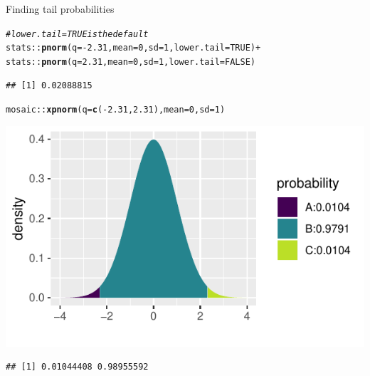 \documentclass{beamer}\usepackage[]{graphicx}\usepackage[]{color}
\newcommand{\hlnum}[1]{\textcolor[rgb]{0.686,0.059,0.569}{#1}}%
\newcommand{\hlcom}[1]{\textcolor[rgb]{0.678,0.584,0.686}{\textit{#1}}}%
\newcommand{\hlopt}[1]{\textcolor[rgb]{0,0,0}{#1}}%
\newcommand{\hlstd}[1]{\textcolor[rgb]{0.345,0.345,0.345}{#1}}%
\newcommand{\hlkwc}[1]{\textcolor[rgb]{0.333,0.667,0.333}{#1}}%
\newcommand{\hlkwd}[1]{\textcolor[rgb]{0.737,0.353,0.396}{\textbf{#1}}}%
\newenvironment{knitrout}{}{} %
\begin{document}
\begin{frame}[fragile]{Finding tail probabilities}



\begin{knitrout}\scriptsize
{}\color{fgcolor}
\begin{alltt}
\hlcom{# lower.tail = TRUE is the default}
\hlstd{stats}\hlopt{::}\hlkwd{pnorm}\hlstd{(}\hlkwc{q} \hlstd{=} \hlopt{-}\hlnum{2.31}\hlstd{,} \hlkwc{mean} \hlstd{=} \hlnum{0}\hlstd{,} \hlkwc{sd} \hlstd{=} \hlnum{1}\hlstd{,} \hlkwc{lower.tail} \hlstd{=} \hlnum{TRUE}\hlstd{)} \hlopt{+}
\hlstd{stats}\hlopt{::}\hlkwd{pnorm}\hlstd{(}\hlkwc{q} \hlstd{=} \hlnum{2.31}\hlstd{,} \hlkwc{mean} \hlstd{=} \hlnum{0}\hlstd{,} \hlkwc{sd} \hlstd{=} \hlnum{1}\hlstd{,} \hlkwc{lower.tail} \hlstd{=} \hlnum{FALSE}\hlstd{)}
\end{alltt}
\begin{verbatim}
## [1] 0.02088815
\end{verbatim}

\end{knitrout}

\pause 

\begin{knitrout}\scriptsize
{}\color{fgcolor}
\begin{alltt}
\hlstd{mosaic}\hlopt{::}\hlkwd{xpnorm}\hlstd{(}\hlkwc{q} \hlstd{=} \hlkwd{c}\hlstd{(}\hlopt{-}\hlnum{2.31}\hlstd{,}\hlnum{2.31}\hlstd{),} \hlkwc{mean} \hlstd{=} \hlnum{0}\hlstd{,} \hlkwc{sd} \hlstd{=} \hlnum{1}\hlstd{)}
\end{alltt}


{\centering \includegraphics[width=0.6\linewidth]{figure/probs7-1} 

}


\begin{verbatim}
## [1] 0.01044408 0.98955592
\end{verbatim}

\end{knitrout}


\end{frame}
\end{document}
